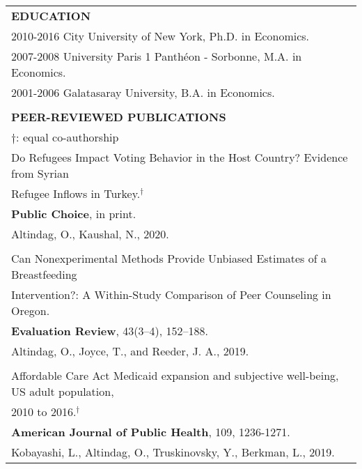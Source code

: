 \documentclass[12 pt]{article}
\begin{document}
\begin{longtable}{ccccc}
\\


\multicolumn{5}{l}{\textbf{EDUCATION}}\\[2 pt]
  \multicolumn{4}{l}{2010\phantom{7}-\phantom{8}2016 \phantom{0000}City University of New York, Ph.D. in Economics.}     \\
    \multicolumn{4}{l}{2007\phantom{1}-\phantom{6}2008 \phantom{000..}University Paris 1 Panth\'{e}on - Sorbonne, M.A. in Economics.} \\
\multicolumn{4}{l}{2001\phantom{1}-\phantom{0}2006 \phantom{000.} Galatasaray University,  B.A. in Economics.}  \\
\\

\multicolumn{5}{l}{\textbf{PEER-REVIEWED PUBLICATIONS }} \\ 
 \multicolumn{5}{l}{\footnotesize{$\dagger$: equal co-authorship}} \\[4 pt]



   \multicolumn{5}{l}{Do Refugees Impact Voting Behavior in the Host Country? Evidence from Syrian} \\
    \multicolumn{5}{l}{Refugee Inflows in Turkey.$^{\dagger}$} \\
     \multicolumn{5}{l}{\textbf{Public Choice}, in print.} \\  
 \multicolumn{5}{l}{Altindag, O., Kaushal, N., 2020.} \\
\\

   \multicolumn{5}{l}{Can Nonexperimental Methods Provide Unbiased Estimates of a Breastfeeding} \\
  \multicolumn{5}{l}{Intervention?: A Within-Study Comparison of Peer Counseling in Oregon. } \\
    \multicolumn{5}{l}{\textbf{Evaluation Review}, 43(3–4), 152–188.} \\
 \multicolumn{5}{l}{Altindag, O., Joyce, T., and Reeder, J. A., 2019.} \\



 \\ 

  \multicolumn{5}{l}{Affordable Care Act Medicaid expansion and subjective well-being, US adult population, } \\
    \multicolumn{5}{l}{2010 to 2016.$^{\dagger}$} \\
   \multicolumn{5}{l}{\textbf{American Journal of Public Health}, 109, 1236-1271.} \\
   \multicolumn{5}{l}{Kobayashi, L., Altindag, O., Truskinovsky, Y., Berkman, L., 2019.}  \\


\end{longtable}
\end{document}
